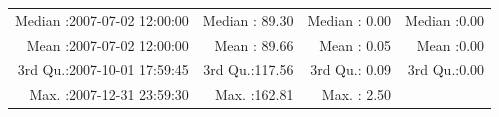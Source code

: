 \documentclass[
  10pt,
  a4paper,oneside]{article}
\begin{document}
\begin{longtable}[]{@{}rrrr@{}}
\begin{minipage}[t]{0.34\columnwidth}\raggedleft
Median :2007-07-02 12:00:00\strut
\end{minipage} & \begin{minipage}[t]{0.19\columnwidth}\raggedleft
Median : 89.30\strut
\end{minipage} & \begin{minipage}[t]{0.18\columnwidth}\raggedleft
Median : 0.00\strut
\end{minipage} & \begin{minipage}[t]{0.18\columnwidth}\raggedleft
Median :0.00\strut
\end{minipage}\tabularnewline
\begin{minipage}[t]{0.34\columnwidth}\raggedleft
Mean :2007-07-02 12:00:00\strut
\end{minipage} & \begin{minipage}[t]{0.19\columnwidth}\raggedleft
Mean : 89.66\strut
\end{minipage} & \begin{minipage}[t]{0.18\columnwidth}\raggedleft
Mean : 0.05\strut
\end{minipage} & \begin{minipage}[t]{0.18\columnwidth}\raggedleft
Mean :0.00\strut
\end{minipage}\tabularnewline
\begin{minipage}[t]{0.34\columnwidth}\raggedleft
3rd Qu.:2007-10-01 17:59:45\strut
\end{minipage} & \begin{minipage}[t]{0.19\columnwidth}\raggedleft
3rd Qu.:117.56\strut
\end{minipage} & \begin{minipage}[t]{0.18\columnwidth}\raggedleft
3rd Qu.: 0.09\strut
\end{minipage} & \begin{minipage}[t]{0.18\columnwidth}\raggedleft
3rd Qu.:0.00\strut
\end{minipage}\tabularnewline
\begin{minipage}[t]{0.34\columnwidth}\raggedleft
Max. :2007-12-31 23:59:30\strut
\end{minipage} & \begin{minipage}[t]{0.19\columnwidth}\raggedleft
Max. :162.81\strut
\end{minipage} & \begin{minipage}[t]{0.18\columnwidth}\raggedleft
Max. : 2.50\strut
\end{minipage} & \begin{minipage}[t]{0.18\columnwidth}\raggedleft

\end{minipage}
\end{longtable}
\end{document}
